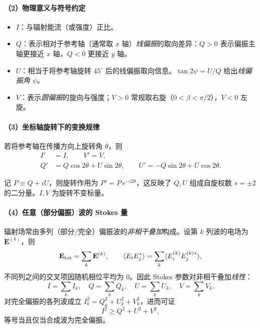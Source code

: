 \paragraph{（2）物理意义与符号约定}
\begin{itemize}[leftmargin=2em]
  \item $I$：与辐射能流（或强度）正比。
  \item $Q$：表示相对于参考轴（通常取 $x$ 轴）\emph{线偏振}的取向差异：$Q>0$ 表示偏振主轴更接近 $x$ 轴，$Q<0$ 更接近 $y$ 轴。
  \item $U$：相当于将参考轴旋转 $45^\circ$ 后的线偏振取向信息。$\tan 2\psi = U/Q$ 给出\emph{线偏振角} $\psi$。
  \item $V$：表示\emph{圆偏振}的旋向与强度；$V>0$ 常规取右旋（$0<\beta<\pi/2$），$V<0$ 左旋。
\end{itemize}

\paragraph{（3）坐标轴旋转下的变换规律}
若将参考轴在传播方向上旋转角 $\theta$，则
\begin{align}
I'&=I,\qquad V'=V,\\
Q'&=Q\cos2\theta+U\sin2\theta,\qquad
U'=-Q\sin2\theta+U\cos2\theta.
\end{align}
\begin{derivationnote}[群表示法简证]
记 $P\equiv Q+iU$，则旋转作用为 $P'\!=\!P\,e^{-i2\theta}$，这反映了 $Q,U$ 组成自旋权数 $s=\pm2$ 的二分量。$I,V$ 为旋转不变标量。
\end{derivationnote}

\paragraph{（4）任意（部分偏振）波的 Stokes 量}
辐射场常由多列（部分/完全）偏振波的\emph{非相干叠加}构成。设第 $k$ 列波的电场为 $\mathbf E^{(k)}$，则
\[
\mathbf E_{\rm tot}=\sum_k \mathbf E^{(k)},\qquad
\langle E_i E_j^\ast\rangle=\sum_k \langle E_i^{(k)} E_j^{(k)\ast}\rangle,
\]
不同列之间的交叉项因随机相位平均为 $0$。因此 Stokes 参数对非相干叠加\emph{线性}：
\[
I=\sum_k I_k,\quad Q=\sum_k Q_k,\quad U=\sum_k U_k,\quad V=\sum_k V_k.
\]
对完全偏振的各列波成立 $I_k^2=Q_k^2+U_k^2+V_k^2$，进而可证
\[
I^2\ge Q^2+U^2+V^2,
\]
等号当且仅当合成波为完全偏振。

